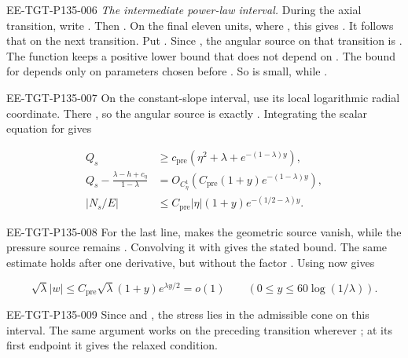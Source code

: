 \begin{EESegment}{EE-TGT-P135-006}
\emph{The intermediate power-law interval.} During the axial transition, write
. Then
. On the final eleven units, where , this gives
. It follows that  on the next
transition. Put . Since , the angular
source on that transition is . The function
 keeps a positive lower bound that does not depend on . The bound
for  depends only on parameters chosen before . So
 is small, while .
\end{EESegment}

\begin{EESegment}{EE-TGT-P135-007}
On the constant-slope interval, use its local logarithmic radial coordinate. There
, so the angular source is exactly
. Integrating the scalar equation for
 gives
\end{EESegment}
\begin{equation}
\begin{aligned}
 Q_s&\geq c_{\mathrm{pre}}(\eta^2+\lambda+e^{-(1-\lambda)y}),\\
 Q_s-\frac{\lambda-h+c_\eta}{1-\lambda}
   &=O_{C^1_\eta}\!\left(C_{\mathrm{pre}}(1+y)e^{-(1-\lambda)y}\right),\\
 |N_s/E|&\leq C_{\mathrm{pre}}|\eta|(1+y)e^{-(1/2-\lambda)y}.
\end{aligned}
\tag{A.27}\label{eq:A.27}
\end{equation}
\begin{EESegment}{EE-TGT-P135-008}
For the last line,  makes the geometric source vanish, while the pressure source remains
. Convolving it with  gives the stated bound. The same
estimate holds after one  derivative, but without the factor
. Using
 now gives
\end{EESegment}
\[
 \sqrt\lambda|w|\leq C_{\mathrm{pre}}\sqrt\lambda(1+y)e^{\lambda y/2}=o(1)
 \qquad(0\leq y\leq60\log(1/\lambda)).
\]
\begin{EESegment}{EE-TGT-P135-009}
Since  and , the stress lies in the admissible cone on
this interval. The same argument works on the preceding transition wherever ; at its first
endpoint it gives the relaxed condition.
\end{EESegment}

